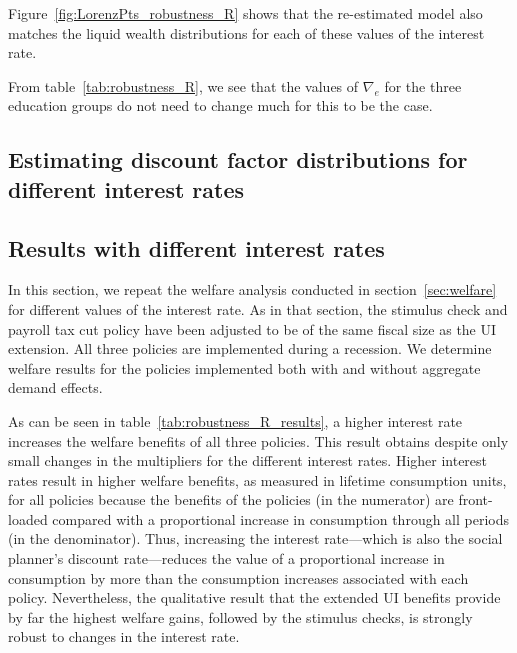 \documentclass[\latexroot/\projectname]{subfiles}
\begin{document}
Figure~\ref{fig:LorenzPts_robustness_R} shows that the re-estimated model also matches the liquid wealth distributions for each of these values of the interest rate.



From table~\ref{tab:robustness_R}, we see that the values of $\nabla_e$ for the three education groups do not need to change much for this to be the case.

\subsection*{Estimating discount factor distributions for different interest rates}
\whenintegrated{\label{app:DF_R}} 

\subsection*{Results with different interest rates}
\whenintegrated{\label{sec:robust_R_results}} 

In this section, we repeat the welfare analysis conducted in section~\ref{sec:welfare} for different values of the interest rate.
As in that section, the stimulus check and payroll tax cut policy have been adjusted to be of the same fiscal size as the UI extension.
All three policies are implemented during a recession.
We determine welfare results for the policies implemented both with and without aggregate demand effects.

As can be seen in table~\ref{tab:robustness_R_results}, a higher interest rate increases the welfare benefits of all three policies.
This result obtains despite only small changes in the multipliers for the different interest rates.
Higher interest rates result in higher welfare benefits, as measured in lifetime consumption units, for all policies because the benefits of the policies (in the numerator) are front-loaded compared with a proportional increase in consumption through all periods (in the denominator).
Thus, increasing the interest rate---which is also the social planner's discount rate---reduces the value of a proportional increase in consumption by more than the consumption increases associated with each policy.
Nevertheless, the qualitative result that the extended UI benefits provide by far the highest welfare gains, followed by the stimulus checks, is strongly robust to changes in the interest rate.
\end{document}
